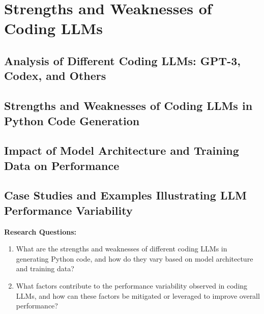 
\chapter{Strengths and Weaknesses of Coding LLMs}
\label{chap:coding_llms}
\pagestyle{fancy}

\section{Analysis of Different Coding LLMs: GPT-3, Codex, and Others}

\section{Strengths and Weaknesses of Coding LLMs in Python Code Generation}

\section{Impact of Model Architecture and Training Data on Performance}

\section{Case Studies and Examples Illustrating LLM Performance Variability}

\textbf{Research Questions:}
\begin{enumerate}
    \item What are the strengths and weaknesses of different coding LLMs in generating Python code, and how do they vary based on model architecture and training data?
    \item What factors contribute to the performance variability observed in coding LLMs, and how can these factors be mitigated or leveraged to improve overall performance?
\end{enumerate}
